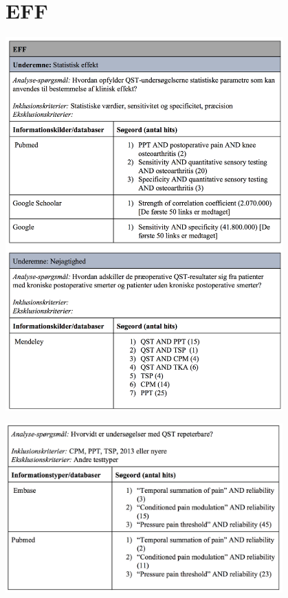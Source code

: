 \section{EFF}\label{EFF_sog}
\begin{center}
\includegraphics[width=0.8\textwidth]{rapportAfsnit/qBilag/sogninger/EFF1}

\includegraphics[width=0.8\textwidth]{rapportAfsnit/qBilag/sogninger/EFF2}
\end{center}

